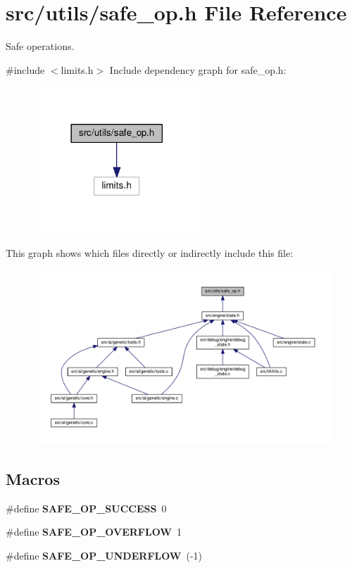 \section{src/utils/safe\+\_\+op.h File Reference}
\label{safe__op_8h}


Safe operations.  


{\ttfamily \#include $<$limits.\+h$>$}\newline
Include dependency graph for safe\+\_\+op.\+h\+:
\nopagebreak
\begin{figure}[H]
\begin{center}
\leavevmode
\includegraphics[width=177pt]{safe__op_8h__incl}
\end{center}
\end{figure}
This graph shows which files directly or indirectly include this file\+:
\nopagebreak
\begin{figure}[H]
\begin{center}
\leavevmode
\includegraphics[width=350pt]{safe__op_8h__dep__incl}
\end{center}
\end{figure}
\subsection*{Macros}
\begin{DoxyCompactItemize}
\item 
\#define \textbf{ S\+A\+F\+E\+\_\+\+O\+P\+\_\+\+S\+U\+C\+C\+E\+SS}~0
\item 
\#define \textbf{ S\+A\+F\+E\+\_\+\+O\+P\+\_\+\+O\+V\+E\+R\+F\+L\+OW}~1
\item 
\#define \textbf{ S\+A\+F\+E\+\_\+\+O\+P\+\_\+\+U\+N\+D\+E\+R\+F\+L\+OW}~(-\/1)
\end{DoxyCompactItemize}


